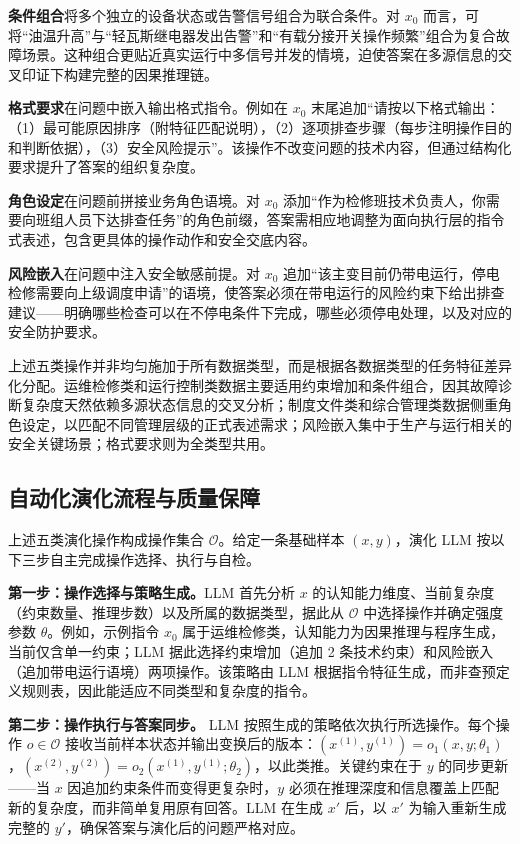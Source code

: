 \documentclass[fontset=fandol,type=master,campus=shenzhen,etitleauto=true]{hithesisbook}
\begin{document}
\textbf{条件组合}将多个独立的设备状态或告警信号组合为联合条件。对 $x_0$ 而言，可将``油温升高''与``轻瓦斯继电器发出告警''和``有载分接开关操作频繁''组合为复合故障场景。这种组合更贴近真实运行中多信号并发的情境，迫使答案在多源信息的交叉印证下构建完整的因果推理链。

\textbf{格式要求}在问题中嵌入输出格式指令。例如在 $x_0$ 末尾追加``请按以下格式输出：（1）最可能原因排序（附特征匹配说明），（2）逐项排查步骤（每步注明操作目的和判断依据），（3）安全风险提示''。该操作不改变问题的技术内容，但通过结构化要求提升了答案的组织复杂度。

\textbf{角色设定}在问题前拼接业务角色语境。对 $x_0$ 添加``作为检修班技术负责人，你需要向班组人员下达排查任务''的角色前缀，答案需相应地调整为面向执行层的指令式表述，包含更具体的操作动作和安全交底内容。

\textbf{风险嵌入}在问题中注入安全敏感前提。对 $x_0$ 追加``该主变目前仍带电运行，停电检修需要向上级调度申请''的语境，使答案必须在带电运行的风险约束下给出排查建议------明确哪些检查可以在不停电条件下完成，哪些必须停电处理，以及对应的安全防护要求。

上述五类操作并非均匀施加于所有数据类型，而是根据各数据类型的任务特征差异化分配。运维检修类和运行控制类数据主要适用约束增加和条件组合，因其故障诊断复杂度天然依赖多源状态信息的交叉分析；制度文件类和综合管理类数据侧重角色设定，以匹配不同管理层级的正式表述需求；风险嵌入集中于生产与运行相关的安全关键场景；格式要求则为全类型共用。

\subsection{自动化演化流程与质量保障}\label{ux4ebaux673aux534fux540cux5ba1ux6838ux673aux5236}

上述五类演化操作构成操作集合 $\mathcal{O}$。给定一条基础样本 $(x, y)$，演化 LLM 按以下三步自主完成操作选择、执行与自检。

\textbf{第一步：操作选择与策略生成。}LLM 首先分析 $x$ 的认知能力维度、当前复杂度（约束数量、推理步数）以及所属的数据类型，据此从 $\mathcal{O}$ 中选择操作并确定强度参数 $\theta$。例如，示例指令 $x_0$ 属于运维检修类，认知能力为因果推理与程序生成，当前仅含单一约束；LLM 据此选择约束增加（追加 2 条技术约束）和风险嵌入（追加带电运行语境）两项操作。该策略由 LLM 根据指令特征生成，而非查预定义规则表，因此能适应不同类型和复杂度的指令。

\textbf{第二步：操作执行与答案同步。} LLM 按照生成的策略依次执行所选操作。每个操作 $o \in \mathcal{O}$ 接收当前样本状态并输出变换后的版本：$(x^{(1)}, y^{(1)}) = o_1(x, y; \theta_1)$，$(x^{(2)}, y^{(2)}) = o_2(x^{(1)}, y^{(1)}; \theta_2)$，以此类推。关键约束在于 $y$ 的同步更新------当 $x$ 因追加约束条件而变得更复杂时，$y$ 必须在推理深度和信息覆盖上匹配新的复杂度，而非简单复用原有回答。LLM 在生成 $x'$ 后，以 $x'$ 为输入重新生成完整的 $y'$，确保答案与演化后的问题严格对应。
\end{document}
